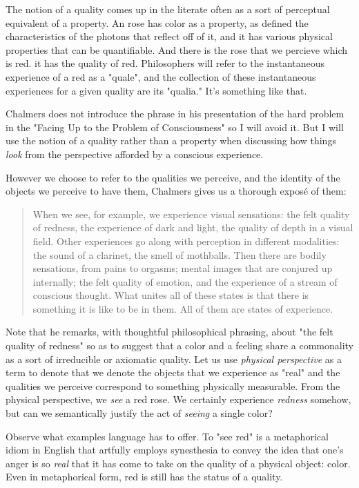 \documentclass[runningheads]{llncs}
\begin{document}
The notion of a quality comes up in the literate often as a sort of perceptual equivalent of a property. An rose has color as a property, as defined the characteristics of the photons that reflect off of it, and it has various physical properties that can be quantifiable. And there is the rose that we percieve which is red. it has the quality of red. Philosophers will refer to the instantaneous experience of a red as a "quale", and the collection of these instantaneous experiences for a given quality are its "qualia." It's something like that. 

Chalmers does not introduce the phrase in his presentation of the hard problem in the "Facing Up to the Problem of Consciousness" so I will avoid it. But I will use the notion of a quality rather than a property when discussing how things \emph{look} from the perspective afforded by a conscious experience. 

However we choose to refer to the qualities we perceive, and the identity of the objects we perceive to have them, Chalmers gives us a thorough exposé of them: 

\begin{quote}
When we see, for example, we experience visual sensations: the felt quality of redness, the experience of dark and light, the quality of depth in a visual field. Other experiences go along with perception in different modalities: the sound of a clarinet, the smell of mothballs. Then there are bodily sensations, from pains to orgasms; mental images that are conjured up internally; the felt quality of emotion, and the experience of a stream of conscious thought. What unites all of these states is that there is something it is like to be in them. All of them are states of experience.
\end{quote}

Note that he remarks, with thoughtful philosophical phrasing, about "the felt quality of redness" so as to suggest that a color and a feeling share a commonality as a sort of irreducible or axiomatic quality. Let us use \textit{physical perspective} as a term to denote that we denote the objects that we experience as "real" and the qualities we perceive correspond to something physically measurable. From the physical perspective, we \textit{see} a red rose. We certainly experience \textit{redness} somehow, but can we semantically justify the act of \textit{seeing} a single color?

Observe what examples language has to offer. To "see red" is a metaphorical idiom in English that artfully employs synesthesia to convey the idea that one's anger is so \textit{real} that it has come to take on the quality of a physical object: color. Even in metaphorical form, red is still has the status of a quality. 
\end{document}
